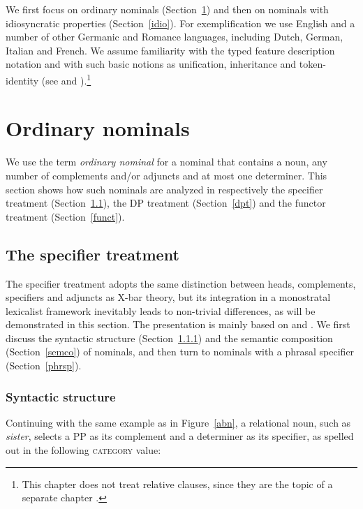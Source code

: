 \documentclass[output=paper
                ,modfonts
                ,nonflat
	        ,collection
	        ,collectionchapter
	        ,collectiontoclongg
 	        ,biblatex
                ,babelshorthands
                ,newtxmath
                ,draftmode
                ,colorlinks, citecolor=brown
]{./langsci/langscibook}
\begin{document}
We first focus on ordinary nominals (Section~\ref{ordi}) and then on nominals with idiosyncratic 
properties (Section~\ref{idio}). For exemplification we use English and a number of other Germanic 
and Romance languages, including Dutch, German, Italian and French.  
We assume familiarity with the typed feature description notation and with such basic notions 
as unification, inheritance and token-identity (see  
and ).\footnote{This chapter does not treat relative clauses,
since they are the topic of a separate chapter .}
    
\section{Ordinary nominals} 
\label{ordi} 

We use the term \emph{ordinary nominal} for a nominal that contains a noun, 
any number of complements and/or adjuncts and at most one determiner. 
This section shows how such nominals are analyzed in respectively the 
specifier treatment (Section~\ref{spect}), the DP treatment (Section~\ref{dpt}) and 
the functor treatment (Section~\ref{funct}). 

    
\subsection{The specifier treatment} 
\label{spect} 


The specifier treatment adopts the same distinction between heads, complements, 
specifiers and adjuncts as X-bar theory, but its integration 
in a monostratal lexicalist framework inevitably leads to non-trivial differences,
as will be demonstrated in this section. 
The presentation is mainly based on \citet{ps2} and \citet{GS00}. 
We first discuss the syntactic structure (Section~\ref{syns}) and the semantic composition (Section~\ref{semco}) 
of nominals, and then turn to nominals with a phrasal specifier (Section~\ref{phrsp}). 


\subsubsection{Syntactic structure}
\label{syns} 

Continuing with the same example as in Figure~\ref{abn}, 
a relational noun, such as \emph{sister}, selects a PP as its complement 
and a determiner as its specifier, as spelled out in 
the following \textsc{category} value:  
\end{document}
